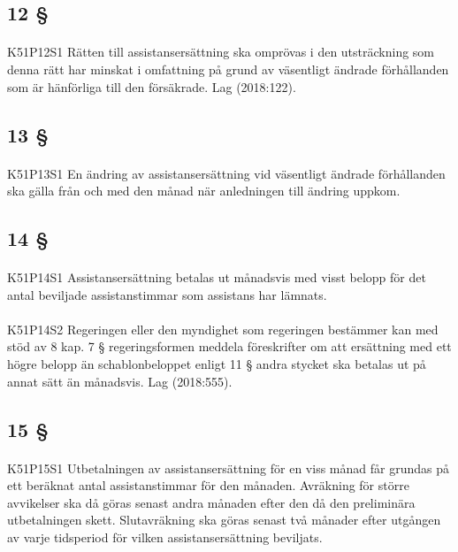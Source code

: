 \documentclass[a4paper,notitlepage,openany,10pt]{book}
\begin{document}
\subsection*{12 §}
\paragraph*{}
{\tiny K51P12S1}
Rätten till assistansersättning ska omprövas i den utsträckning som denna rätt har minskat i omfattning på grund av väsentligt ändrade förhållanden som är hänförliga till den försäkrade.
Lag (2018:122).
\subsection*{13 §}
\paragraph*{}
{\tiny K51P13S1}
En ändring av assistansersättning vid väsentligt ändrade förhållanden ska gälla från och med den månad när anledningen till ändring uppkom.
\subsection*{14 §}
\paragraph*{}
{\tiny K51P14S1}
Assistansersättning betalas ut månadsvis med visst belopp för det antal beviljade assistanstimmar som assistans har lämnats.
\paragraph*{}
{\tiny K51P14S2}
Regeringen eller den myndighet som regeringen bestämmer kan med stöd av 8 kap. 7 § regeringsformen meddela föreskrifter om att ersättning med ett högre belopp än schablonbeloppet enligt 11 § andra stycket ska betalas ut på annat sätt än månadsvis.
Lag (2018:555).
\subsection*{15 §}
\paragraph*{}
{\tiny K51P15S1}
Utbetalningen av assistansersättning för en viss månad får grundas på ett beräknat antal assistanstimmar för den månaden. Avräkning för större avvikelser ska då göras senast andra månaden efter den då den preliminära utbetalningen skett. Slutavräkning ska göras senast två månader efter utgången av varje tidsperiod för vilken assistansersättning beviljats.
\end{document}

